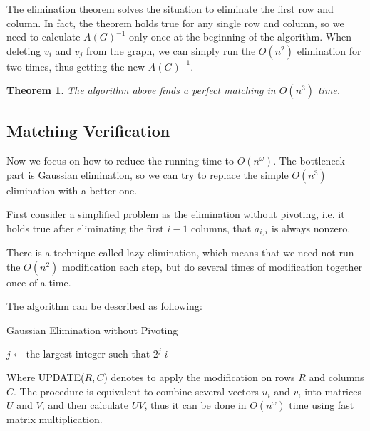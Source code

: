 \documentclass[a4paper]{article}
\newtheorem{theorem}{\hspace{2em}Theorem}
\begin{document}
			The elimination theorem solves the situation to eliminate the first row and column. In fact, the theorem holds true for any single row and column, so we need to calculate $A(G)^{-1}$ only once at the beginning of the algorithm. When deleting $v_i$ and $v_j$ from the graph, we can simply run the $O(n^2)$ elimination for two times, thus getting the new $A(G)^{-1}$.

			\begin{theorem}
				The algorithm above finds a perfect matching in $O(n^3)$ time.
			\end{theorem}

		\subsection{Matching Verification}

			\hspace{2em}Now we focus on how to reduce the running time to $O(n^\omega)$. The bottleneck part is Gaussian elimination, so we can try to replace the simple $O(n^3)$ elimination with a better one.

			First consider a simplified problem as the elimination without pivoting, i.e. it holds true after eliminating the first $i - 1$ columns, that $a_{i, i}$ is always nonzero.

			There is a technique called lazy elimination, which means that we need not run the $O(n^2)$ modification each step, but do several times of modification together once of a time.

			The algorithm can be described as following:

			\begin{algorithm}
				\caption{Gaussian Elimination without Pivoting}
				\label{simple}

				\begin{algorithmic}[1]
							\State $j \gets \text{the largest integer such that } 2^j | i$
						\EndFor
					\EndFunction
				\end{algorithmic}

			\end{algorithm}

			Where UPDATE($R, C$) denotes to apply the modification on rows $R$ and columns $C$. The procedure is equivalent to combine several vectors $u_i$ and $v_i$ into matrices $U$ and $V$, and then calculate $UV$, thus it can be done in $O(n^\omega)$ time using fast matrix multiplication.
\end{document}
